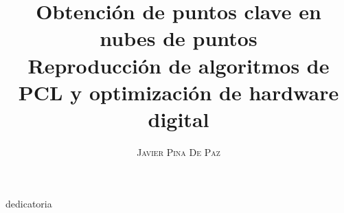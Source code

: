 \documentclass[a4paper,11pt]{book}
\title{\Huge \textbf{Obtención de puntos clave en nubes de puntos }   \\ \huge Reproducción de algoritmos de PCL y optimización de hardware digital}
\author{\textsc{Javier Pina De Paz}} %
\begin{document}
\frontmatter
\maketitle

\begin{dedication}
dedicatoria
\end{dedication}

\tableofcontents

\mainmatter  %











\end{document}
